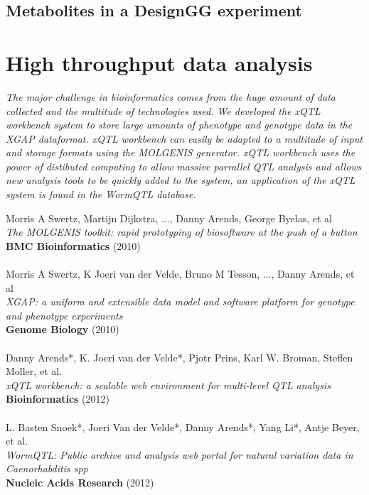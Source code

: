 \documentclass[8pt, twoside, a5paper]{report}
\newenvironment{myexampleblock}[1]{%
    \tcolorbox[beamer,%
    noparskip,breakable,
    colback=LightGreen,colframe=DarkGreen,%
    colbacklower=LimeGreen!75!LightGreen,%
    title=#1]}%
    {\endtcolorbox}
\newcommand{\authors}[1]{\small{#1}}
\newcommand{\bold}[1]{{\bfseries #1}}
\begin{document}
\section{Metabolites in a DesignGG experiment}
\lipsum

\chapter{High throughput data analysis}

\emph{The major challenge in bioinformatics comes from the huge amount of data collected and the multitude of technologies used. We developed 
the xQTL workbench system\cite{Arends:2012} to store large amounts of phenotype and genotype data in the XGAP\cite{Swertz:2010a} 
dataformat. xQTL workbench can easily be adapted to a multitude of input and storage formats using the MOLGENIS\cite{Swertz:2004} 
generator. xQTL workbench uses the power of distibuted computing to allow massive parrallel QTL analysis and allows new analysis 
tools to be quickly added to the system, an application of the xQTL system is found in the WormQTL database\cite{Snoek:2012}.}

\null
\vfill

\begin{myexampleblock}{Originally published as:}
  \authors{Morris A Swertz, Martijn Dijkstra, ..., Danny Arends, George Byelas, et al}\\
  \emph{The MOLGENIS toolkit: rapid prototyping of biosoftware at the push of a button}\\
  \bold{BMC Bioinformatics} (2010)\\\\

  \authors{Morris A Swertz, K Joeri van der Velde, Bruno M Tesson, ..., Danny Arends, et al}\\
  \emph{XGAP: a uniform and extensible data model and software platform for genotype and phenotype experiments}\\
  \bold{Genome Biology} (2010)\\\\

  \authors{Danny Arends*, K. Joeri van der Velde*, Pjotr Prins, Karl W. Broman, Steffen Moller, et al.}\\
  \emph{xQTL workbench: a scalable web environment for multi-level QTL analysis}\\
  \bold{Bioinformatics} (2012)\\\\

  \authors{L. Basten Snoek*, Joeri Van der Velde*, Danny Arends*, Yang Li*, Antje Beyer, et al.}\\
  \emph{WormQTL: Public archive and analysis web portal for natural variation data in Caenorhabditis spp}\\
  \bold{Nucleic Acids Research} (2012)
\end{myexampleblock}
\end{document}
